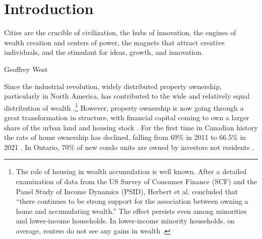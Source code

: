 \chapter{Introduction} \label{chapter-introduction}
\epigraph{Cities are the crucible of civilization, the hubs of innovation, the engines of wealth creation and centers of power, the magnets that attract creative individuals, and the stimulant for ideas, growth, and innovation.}{Geoffrey West \cite{westScaleUniversalLaws2017}}

Since the industrial revolution, widely distributed property ownership, particularly in North America, has contributed to the wide and relatively equal distribution of {wealth} \cite{pikettyCapitalTwentyfirstCentury2014, harrisGrowthHomeOwnership1977, chevanGrowthHomeOwnership1989, andrewsEvolutionHomeownershipRates2011}.\footnote{The role of housing in wealth accumulation is well known. After a detailed  examination of data from the US Survey of Consumer Finance (SCF) and the Panel Study of Income Dynamics (PSID), Herbert et al. concluded that ``there continues to be strong support for the association between owning a home and accumulating wealth.'' The effect persists even among minorities and lower-income households. In lower-income minority households, on average, renters do not see any gains in wealth \cite{herbertHomeownershipStillEffective2013}.} However, property ownership is now going through a great transformation in structure, with financial capital coming to own a larger share of the urban land and housing stock \cite{farhaReportFinancializationHousing2017, palleyFinancializationWhatIt2007}. For the first time in Canadian history the rate of home ownership has declined, falling from 69\%  in 2011 to 66.5\% in 2021 \cite{statisticscanadaBuyRentHousing2022}. %
In Ontario, 70\% of new condo units are owned by investors not residents \cite{GET77percent}. 

